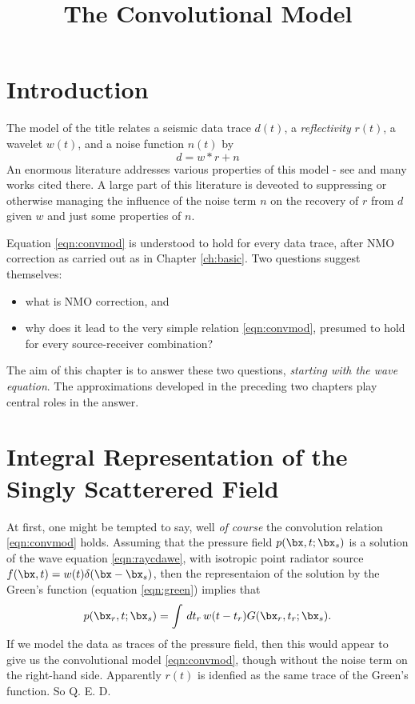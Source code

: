 \title{The Convolutional Model}
\maketitle
\label{ch:conv}

\section{Introduction}
The model of the title relates a seismic data trace $d(t)$, a {\em reflectivity} $r(t)$, a wavelet $w(t)$, and a noise function $n(t)$ by
\begin{equation}
\label{eqn:convmod}
d = w * r + n
\end{equation}
An enormous literature addresses various properties of this model - see \cite{RobTrei:80} and many works cited there. A large part of this literature is deveoted to suppressing or otherwise managing the influence of the noise term $n$ on the recovery of $r$ from $d$ given $w$ and just some properties of $n$.

Equation \ref{eqn:convmod} is understood to hold for every data trace, after NMO correction as carried out as in Chapter \ref{ch:basic}. Two questions suggest themselves: 
\begin{itemize}
\item what is NMO correction, and 
\item why does it lead to the very simple relation \ref{eqn:convmod}, presumed to hold for every source-receiver combination?
\end{itemize}
The aim of this chapter is to answer these two questions, {\em starting with the wave equation}. The approximations developed in the preceding two chapters play central roles in the answer.

\section{Integral Representation of the Singly Scatterered Field}
At first, one might be tempted to say, well {\em of course} the convolution relation \ref{eqn:convmod} holds. Assuming that the pressure field $p(\bx,t;\bx_s)$ is a solution of the wave equation \ref{eqn:raycdawe}, with isotropic point radiator source $f(\bx,t) = w(t)\delta(\bx-\bx_s)$, then the representaion of the solution by the Green's function (equation \ref{eqn:green}) implies that
\begin{equation}
\label{eqn:greenpt}
p(\bx_r,t;\bx_s) = \int\, dt_r\, w(t-t_r) G(\bx_r,t_r;\bx_s).
\end{equation}
If we model the data as traces of the pressure field, then this would appear to give us the convolutional model \ref{eqn:convmod}, though without the noise term on the right-hand side. Apparently $r(t)$ is idenfied as the same trace of the Green's function. So Q. E. D.

